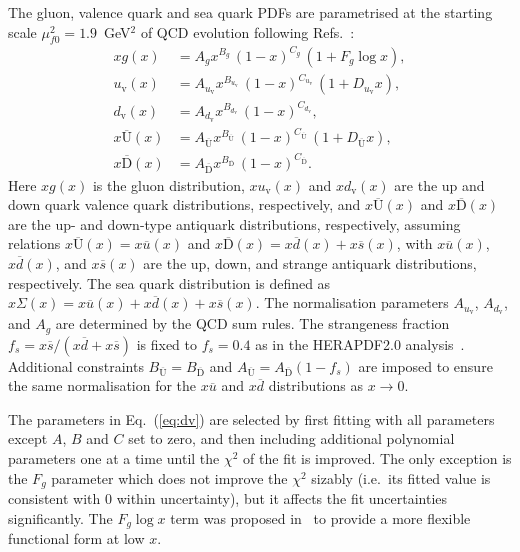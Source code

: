 \documentclass[12pt]{article}
\begin{document}
The gluon, valence quark and sea quark PDFs are parametrised at the starting scale $\mu^2_{f0} = 1.9$~GeV$^2$ of QCD evolution following Refs.~\cite{Abramowicz:2015mha}:
\begin{equation}\begin{aligned}
xg(x) &= A_{g} x^{B_{g}}\,(1-x)^{C_{g}}\, (1 + F_{g} {\log x}),\\
u_\mathrm{v}(x) &= A_{u_\mathrm{v}}x^{B_{u_\mathrm{v}}}\,(1-x)^{C_{u_\mathrm{v}}}\,(1+D_{u_\mathrm{v}}x) ,\\
d_\mathrm{v}(x) &= A_{d_\mathrm{v}}x^{B_{d_\mathrm{v}}}\,(1-x)^{C_{d_\mathrm{v}}},\\
x\overline{\mathrm{U}}(x)&= A_{\overline{\mathrm{U}}}x^{B_{\overline{\mathrm{U}}}}\, (1-x)^{C_{\overline{\mathrm{U}}}}\, (1+D_{\overline{\mathrm{U}}}x), \\
x\overline{\mathrm{D}}(x)&= A_{\overline{\mathrm{D}}}x^{B_{\overline{\mathrm{D}}}}\, (1-x)^{C_{\overline{\mathrm{D}}}}.
\end{aligned}
\label{eq:dv}
\end{equation}
Here $xg(x)$ is the gluon distribution, $xu_{\mathrm{v}}(x)$ and $xd_{\mathrm{v}}(x)$ are the up and down quark valence quark distributions, respectively, and $x\overline{\mathrm{U}}(x)$ and $x\overline{\mathrm{D}}(x)$ are 
the up- and down-type antiquark distributions, respectively, assuming relations $x\overline{\mathrm{U}}(x) = x\overline{u}(x)$ and $x\overline{\mathrm{D}}(x) = x\overline{d}(x) + x\overline{s}(x)$, with $x\overline{u}(x)$, $x\overline{d}(x)$, and $x\overline{s}(x)$ are the up, down, and strange antiquark distributions, respectively.
The sea quark distribution is defined as $x\Sigma(x)=x\overline{u}(x)+x\overline{d}(x)+x\overline{s}(x)$.
The normalisation parameters $A_{u_{\mathrm{v}}}$, $A_{d_\mathrm{v}}$, and $A_{g}$ are determined by the QCD sum rules.
The strangeness fraction $f_{s} = x\overline{s}/( x\overline{d} + x\overline{s})$ is fixed to
$f_{s}=0.4$ as in the HERAPDF2.0 analysis~\cite{Abramowicz:2015mha}.
Additional constraints $B_{\overline{\mathrm{U}}} = B_{\overline{\mathrm{D}}}$ and $A_{\overline{\mathrm{U}}} = A_{\overline{\mathrm{D}}}(1 - f_{s})$ are imposed to ensure the same normalisation for the $x\overline{u}$ and $x\overline{d}$ distributions as $x \to 0$.

The parameters in Eq.~(\ref{eq:dv}) are selected by first fitting with all parameters except $A$, $B$ and $C$ set to zero, and then including additional polynomial parameters one at a time until the $\chi^2$ of the fit is improved.
 The only exception is the $F_{g}$ parameter which does not improve the $\chi^2$ sizably (i.e.\ its fitted value is consistent with $0$ within uncertainty), but it affects the fit uncertainties significantly. The $F_g\log x$ term was proposed in~\cite{Bonvini:2019wxf} to provide a more flexible functional form at low $x$.
 
\end{document}
